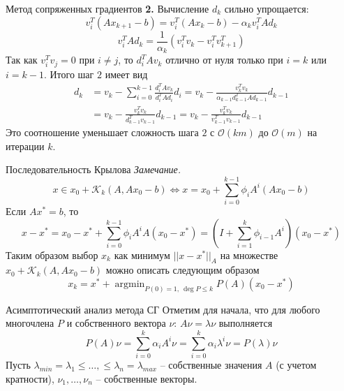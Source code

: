 \documentclass[10pt]{beamer}
\DeclareMathOperator{\argmin}{argmin}
\begin{document}
\begin{frame}{Метод сопряженных градиентов}
\textbf{2.} Вычисление $d_k$ сильно упрощается:
$$
v_i^T(Ax_{k+1}-b)=v_i^T(Ax_{k}-b)-\alpha_{k}v_i^TAd_{k}
$$
$$
v_i^TAd_{k}=\frac{1}{\alpha_{k}}\left(v_i^Tv_{k}-v_i^Tv_{k+1}^T\right)
$$
\pause
Так как $v_i^Tv_j=0$ при $i\neq j$, то $d_i^TAv_k$ отлично от нуля только при $i=k$ или $i=k-1$. Итого шаг $2$ имеет вид
\begin{align*}
d_k&=v_k-\sum_{i=0}^{k-1}\frac{d_i^TAv_k}{d_i^TAd_i}d_i=v_k-\frac{v_{k}^Tv_{k}}{\alpha_{k-1}d_{k-1}^TAd_{k-1}}d_{k-1}\\
&=v_k-\frac{v_{k}^Tv_{k}}{d_{k-1}^Tv_{k-1}}d_{k-1}
=v_k-\frac{v_{k}^Tv_{k}}{v_{k-1}^Tv_{k-1}}d_{k-1}
\end{align*}
\pause
Это соотношение уменьшает сложность шага $2$ с $\mathcal{O}(km)$ до $\mathcal{O}(m)$ на итерации $k$.

\end{frame}

\begin{frame}{Последовательность Крылова}
\textit{Замечание.}
$$
x\in x_0+\mathcal{K}_k(A, Ax_0-b)\Leftrightarrow x= x_0+\sum_{i=0}^{k-1}\phi_iA^i(Ax_0-b)
$$
Если $Ax^*=b$, то
$$
x-x^*=x_0-x^*+\sum_{i=0}^{k-1}\phi_iA^iA(x_0-x^*)=\left(I+\sum_{i=1}^{k}\phi_{i-1}A^i\right)(x_0-x^*)
$$
\pause
Таким образом выбор $x_k$ как минимум $||x-x^*||_A$ на множестве $x_0+\mathcal{K}_k(A, Ax_0-b)$ можно
описать следующим образом
$$
x_k=x^*+\argmin_{P(0)=1,~\deg P\leq k}P(A)(x_0-x^*)	
$$

\end{frame}

\begin{frame}{Асимптотический анализ метода СГ}
Отметим для начала, что для любого многочлена $P$ и собственного вектора $\nu$: $A\nu=\lambda\nu$ выполняется
$$
P(A)\nu=\sum_{i=0}^k\alpha_iA^i\nu=\sum_{i=0}^k\alpha_i\lambda^i\nu=P(\lambda)\nu
$$
\pause
Пусть $\lambda_{min}=\lambda_1\leq \ldots, \leq \lambda_n=\lambda_{max}$ -- собственные значения $A$ (с учетом кратности), $\nu_1, \ldots, \nu_n$ --
собственные векторы. 
\end{frame}
\end{document}
